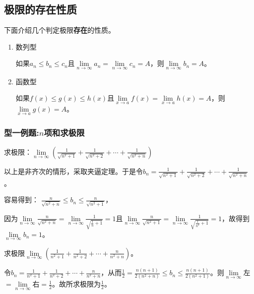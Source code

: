 \documentclass[cn,12pt,chinese]{elegantbook}
\begin{document}
    \subsection{极限的存在性质}
    下面介绍几个判定极限\textbf{存在}的性质。
    \begin{property}
    \begin{enumerate}
        \item 数列型
       
        如果$ a_n\leq b_n\leq c_n $且$ \lim\limits_{n \to \infty}a_n=\lim\limits_{n \to \infty}c_n=A $，则$ \lim\limits_{n \to \infty}b_n=A $。
        \item 函数型
        
        如果$ f(x)\leq g(x)\leq h(x) $且$ \lim\limits_{x \to a}f(x)=\lim\limits_{x \to a}h(x)=A $，则$ \lim\limits_{x \to a}g(x)=A $。
    \end{enumerate}
    \end{property}
    \subsubsection*{型一例题:$n$项和求极限}
    \begin{example}
        求极限：$\lim\limits_{n \to \infty}(\displaystyle\frac{1}{\sqrt{n^2+1}}+\displaystyle\frac{1}{\sqrt{n^2+2}}+ \cdots +\frac{1}{\sqrt{n^2+n}})$
    \end{example}
    \begin{solution}
        以上是非齐次的情形，采取夹逼定理。于是令$b_n=\displaystyle\frac{1}{\sqrt{n^2+1}}+\displaystyle\frac{1}{\sqrt{n^2+2}}+ \cdots +\frac{1}{\sqrt{n^2+n}}$。
        
        容易得到：
        $\displaystyle\frac{n}{\sqrt{n^2+n}}\leq b_n \leq \displaystyle\frac{n}{\sqrt{n^2+1}}$，
        
        因为$\lim\limits_{n \to \infty}\displaystyle\frac{n}{\sqrt{n^2+n}}=\lim\limits_{n\to\infty}\displaystyle\frac{1}{\sqrt{\frac{1}{n}+1}}=1$且$\lim\limits_{n \to \infty}\displaystyle\frac{n}{\sqrt{n^2+1}}=\lim\limits_{n\to\infty}\displaystyle\frac{1}{\sqrt{\frac{1}{n^2}+1}}=1$，故得到$\lim\limits_{n \to \infty}b_n=1$。
    \end{solution}

    \begin{example}
        求极限$ \lim\limits_{n \to \infty}(\displaystyle\frac{1}{n^2+1}+\displaystyle\frac{1}{n^2+2}+\cdots+\displaystyle\frac{n}{n^2+n}) $。
    \end{example}
    \begin{solution}
        令$ b_n=\displaystyle\frac{1}{n^2+1}+\displaystyle\frac{1}{n^2+2}+\cdots+\displaystyle\frac{n}{n^2+n}$，从而$\displaystyle\frac{1}{2}=\displaystyle\frac{n(n+1)}{2(n^2+n)} \leq b_n \leq\displaystyle\frac{n(n+1)}{2(n^2+1)}$。则$\lim\limits_{n \to \infty}$左$=\lim\limits_{n \to \infty}$右$=\displaystyle\frac{1}{2}$。故所求极限为$\displaystyle\frac{1}{2}$。
    \end{solution}
\end{document}
